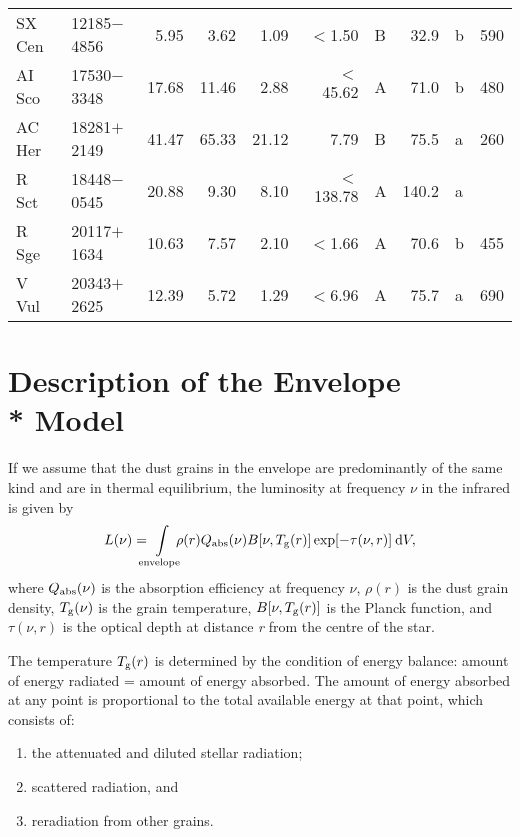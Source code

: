 \documentclass[useAMS,usenatbib]{mn2e}
\begin{document}
\begin{table*}
\begin{minipage}{140mm}
\begin{tabular}{@{}llrrrrlrlr@{}}
 SX Cen & 12185$-$4856 & 5.95 & 3.62 & 1.09 & $<$1.50 & B & 32.9 & b & 590 \\
 AI Sco & 17530$-$3348 & 17.68 & 11.46 & 2.88 & $<$45.62 & A & 71.0 & b & 480 \\
 AC Her & 18281$+$2149 & 41.47 & 65.33 & 21.12 & 7.79 & B & 75.5 & a & 260 \\
 R Sct  & 18448$-$0545 & 20.88 & 9.30 & 8.10 & $<$138.78 & A & 140.2 & a \\
 R Sge  & 20117$+$1634 & 10.63 & 7.57 & 2.10 & $<$1.66 & A & 70.6 & b & 455 \\
 V Vul  & 20343$+$2625 & 12.39 & 5.72 & 1.29 & $<$6.96 & A & 75.7 & a & 690\\
\hline
\end{tabular}
\end{minipage}
\end{table*}

\section[]{Description of the Envelope\\* Model}

If we assume that the dust grains in the envelope are  predominantly of
the same kind and are in thermal  equilibrium, the luminosity at
frequency $\nu$ in the infrared is given by
\begin{equation}
   L(\nu)=\mskip-12mu\int\limits_{{\mathrm{envelope}}}\mskip-12mu
   \rho(r)Q_{{\mathrm{abs}}}(\nu)B[\nu,T_{{\mathrm{g}}}(r)]\exp [-\tau(\nu,r)]\>
   {\mathrm{d}}V,
\end{equation}
 where
 $Q_{{\mathrm{abs}}}(\nu)$ is the absorption efficiency at frequency $\nu$,
 $\rho(r)$            is the dust grain density,
 $T_{{\mathrm{g}}}(\nu)$    is the grain temperature,
 $B[\nu,T_{{\mathrm{g}}}(r)]$  is the Planck function, and
 $\tau(\nu,r)$        is the optical depth at distance {\it r\/} from the
                      centre of the star.

The temperature $T_{{\mathrm{g}}}(r)$ is determined by the condition of energy
balance: amount of energy radiated = amount of energy absorbed. The
amount of energy absorbed at any point is proportional to the total
available energy at that point, which consists of:
\begin{enumerate}
  \item the attenuated and diluted stellar radiation;
  \item scattered radiation, and
  \item reradiation from other grains.
\end{enumerate}
\end{document}
